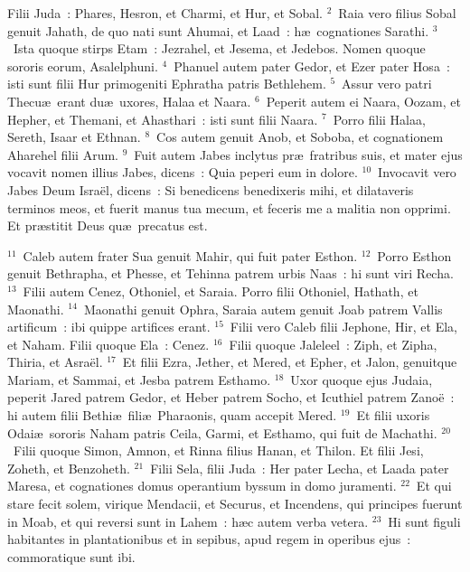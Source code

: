 \lettrine[lines=3,image=true,loversize=0.05,lraise=-0.03]{F}{}ilii Juda~: Phares, Hesron, et Charmi, et Hur, et Sobal.
${}^{2}$~Raia vero filius Sobal genuit Jahath, de quo nati sunt Ahumai, et Laad~: h\ae\ cognationes Sarathi.
${}^{3}$~Ista quoque stirps Etam~: Jezrahel, et Jesema, et Jedebos. Nomen quoque sororis eorum, Asalelphuni.
${}^{4}$~Phanuel autem pater Gedor, et Ezer pater Hosa~: isti sunt filii Hur primogeniti Ephratha patris Bethlehem.
${}^{5}$~Assur vero patri Thecu\ae\ erant du\ae\ uxores, Halaa et Naara.
${}^{6}$~Peperit autem ei Naara, Oozam, et Hepher, et Themani, et Ahasthari~: isti sunt filii Naara.
${}^{7}$~Porro filii Halaa, Sereth, Isaar et Ethnan.
${}^{8}$~Cos autem genuit Anob, et Soboba, et cognationem Aharehel filii Arum.
${}^{9}$~Fuit autem Jabes inclytus pr\ae\ fratribus suis, et mater ejus vocavit nomen illius Jabes, dicens~: Quia peperi eum in dolore.
${}^{10}$~Invocavit vero Jabes Deum Isra\"el, dicens~: Si benedicens benedixeris mihi, et dilataveris terminos meos, et fuerit manus tua mecum, et feceris me a malitia non opprimi. Et pr\ae stitit Deus qu\ae\ precatus est.


${}^{11}$~Caleb autem frater Sua genuit Mahir, qui fuit pater Esthon.
${}^{12}$~Porro Esthon genuit Bethrapha, et Phesse, et Tehinna patrem urbis Naas~: hi sunt viri Recha.
${}^{13}$~Filii autem Cenez, Othoniel, et Saraia. Porro filii Othoniel, Hathath, et Maonathi.
${}^{14}$~Maonathi genuit Ophra, Saraia autem genuit Joab patrem Vallis artificum~: ibi quippe artifices erant.
${}^{15}$~Filii vero Caleb filii Jephone, Hir, et Ela, et Naham. Filii quoque Ela~: Cenez.
${}^{16}$~Filii quoque Jaleleel~: Ziph, et Zipha, Thiria, et Asra\"el.
${}^{17}$~Et filii Ezra, Jether, et Mered, et Epher, et Jalon, genuitque Mariam, et Sammai, et Jesba patrem Esthamo.
${}^{18}$~Uxor quoque ejus Judaia, peperit Jared patrem Gedor, et Heber patrem Socho, et Icuthiel patrem Zano\"e~: hi autem filii Bethi\ae\ fili\ae\ Pharaonis, quam accepit Mered.
${}^{19}$~Et filii uxoris Odai\ae\ sororis Naham patris Ceila, Garmi, et Esthamo, qui fuit de Machathi.
${}^{20}$~Filii quoque Simon, Amnon, et Rinna filius Hanan, et Thilon. Et filii Jesi, Zoheth, et Benzoheth.
${}^{21}$~Filii Sela, filii Juda~: Her pater Lecha, et Laada pater Maresa, et cognationes domus operantium byssum in domo juramenti.
${}^{22}$~Et qui stare fecit solem, virique Mendacii, et Securus, et Incendens, qui principes fuerunt in Moab, et qui reversi sunt in Lahem~: h\ae c autem verba vetera.
${}^{23}$~Hi sunt figuli habitantes in plantationibus et in sepibus, apud regem in operibus ejus~: commoratique sunt ibi.


